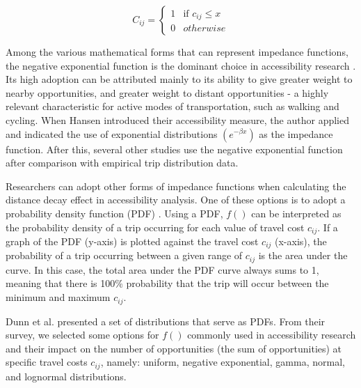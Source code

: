 \documentclass[preprint, 3p,
authoryear]{elsarticle} %
\begin{document}
\begin{equation}
C_{ij} =
\begin{cases}
  1 & \text{if } c_{ij} \le x \\
  0 & otherwise
\end{cases}
\label{eq:cumulative-equation}
\end{equation}

Among the various mathematical forms that can represent impedance
functions, the negative exponential function is the dominant choice in
accessibility research
\citep{meyer1984urban, gutierrez1996european, kwan1998space, apparicio2008comparing, iacono2008access, iacono2010, larsen2010beyond, millward2013active}.
Its high adoption can be attributed mainly to its ability to give
greater weight to nearby opportunities, and greater weight to distant
opportunities - a highly relevant characteristic for active modes of
transportation, such as walking and cycling. When Hansen
\citeyearpar{hansen1959accessibility} introduced their accessibility
measure, the author applied and indicated the use of exponential
distributions \((e ^ {-\beta x})\) as the impedance function. After
this, several other studies
\citep{fotheringham1989spatial, de2009exponential, iacono2010, signorino2011gravity, prins2014many}
use the negative exponential function after comparison with empirical
trip distribution data.

Researchers can adopt other forms of impedance functions when
calculating the distance decay effect in accessibility analysis. One of
these options is to adopt a probability density function (PDF)
\citep{soukhov2024}. Using a PDF, \(f()\) can be interpreted as the
probability density of a trip occurring for each value of travel cost
\(c_{ij}\). If a graph of the PDF (y-axis) is plotted against the travel
cost \(c_{ij}\) (x-axis), the probability of a trip occurring between a
given range of \(c_{ij}\) is the area under the curve. In this case, the
total area under the PDF curve always sums to 1, meaning that there is
100\% probability that the trip will occur between the minimum and
maximum \(c_{ij}\).

Dunn et al. \citeyearpar{dunn2023} presented a set of distributions that
serve as PDFs. From their survey, we selected some options for \(f()\)
commonly used in accessibility research and their impact on the number
of opportunities (the sum of opportunities) at specific travel costs
\(c_{ij}\), namely: uniform, negative exponential, gamma, normal, and
lognormal distributions.
\end{document}
